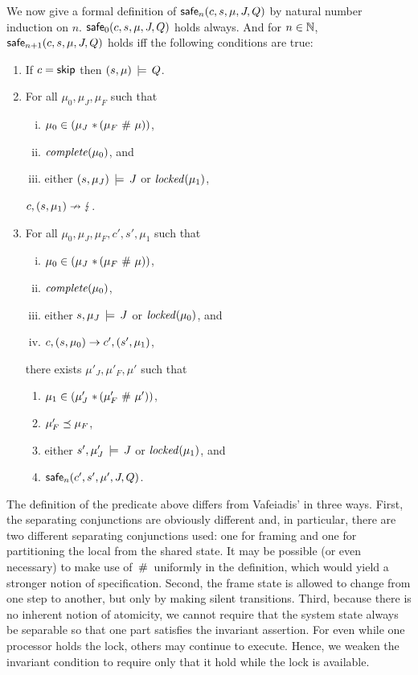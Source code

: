 \documentclass[11pt]{report}
\begin{document}
We now give a formal definition of $\mathsf{safe}_{n}(c,s,\mu,J,Q)$ by natural number induction on $n$. $\mathsf{safe}_{0}(c,s,\mu,J,Q)$ holds always. And for $n \in \mathbb{N}$, $\mathsf{safe}_{n+1}(c,s,\mu,J,Q)$ holds iff the following conditions are true: \begin{enumerate}
  \item If $c = \operatorname{\mathsf{skip}}$ then $(s,\mu) \,\models\, Q$.

  \item For all $\mu_0,\mu_J,\mu_F$ such that \begin{enumerate}[(i)]
    \item $\mu_0 \in (\mu_J \operatorname{\,\ast\,} (\mu_F \operatorname{\,\#\,} \mu))$,
    \item $\mathit{complete}(\mu_0)$, and
    \item either $(s,\mu_J) \,\models\, J$ or $\mathit{locked}(\mu_1)$,
  \end{enumerate} $c,(s,\mu_1) \nrightarrow \lightning$.

  \item For all $\mu_0,\mu_J,\mu_F,c',s',\mu_1$ such that \begin{enumerate}[(i)]
    \item $\mu_0 \in (\mu_J \operatorname{\,\ast\,} (\mu_F \operatorname{\,\#\,} \mu))$,
    \item $\mathit{complete}(\mu_0)$,
    \item either $s,\mu_J \,\models\, J$ or $\mathit{locked}(\mu_0)$, and 
    \item $c,(s,\mu_0) \rightarrow c',(s',\mu_1)$,
  \end{enumerate} there exists $\mu'_J,\mu'_F,\mu'$ such that \begin{enumerate}
    \item $\mu_1 \in (\mu'_J \operatorname{\,\ast\,} (\mu'_F \operatorname{\,\#\,} \mu'))$,
    \item $\mu'_F \preceq \mu_F$,
    \item either $s',\mu'_J \,\models\, J$ or $\mathit{locked}(\mu_1)$, and
    \item $\mathsf{safe}_{n}(c',s',\mu',J,Q)$.
  \end{enumerate}

\end{enumerate}

The definition of the predicate above differs from Vafeiadis' in three ways. First, the separating conjunctions are obviously different and, in particular, there are two different separating conjunctions used: one for framing and one for partitioning the local from the shared state. It may be possible (or even necessary) to make use of $\operatorname{\,\#\,}$ uniformly in the definition, which would yield a stronger notion of specification. Second, the frame state is allowed to change from one step to another, but only by making silent transitions. Third, because there is no inherent notion of atomicity, we cannot require that the system state always be separable so that one part satisfies the invariant assertion. For even while one processor holds the lock, others may continue to execute. Hence, we weaken the invariant condition to require only that it hold while the lock is available.
\end{document}
